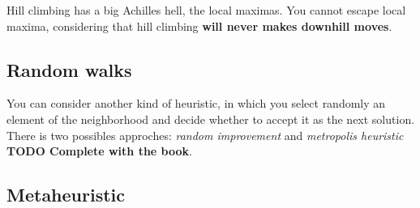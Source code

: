 Hill climbing has a big Achilles hell, the local maximas. You cannot escape local maxima, considering that hill climbing \textbf{will never makes downhill moves}.

\subsection{Random walks}

You can consider another kind of heuristic, in which you select randomly an element of the neighborhood and decide whether to accept it as the next solution. There is two possibles approches: \textit{random improvement} and \textit{metropolis heuristic} \textbf{TODO Complete with the book}.

\subsection{Metaheuristic}

